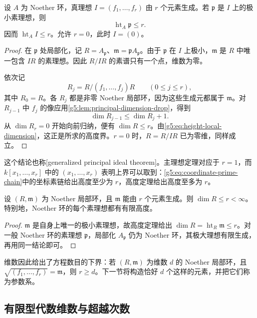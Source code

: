 \begin{theorem}\label{g5:thm:height-theorem}
	设 \(A\) 为 Noether 环，真理想 \(I=(f_1,\ldots,f_r)\) 由 \(r\) 个元素生成。若 \(\mathfrak p\) 是 \(I\) 上的极小素理想，则
	\[
	\operatorname{ht}_A\mathfrak p\leq r.
	\]
	因而 \(\operatorname{ht}_A I\leq r\)。允许 \(r=0\)，此时 \(I=(0)\)。
\end{theorem}
\begin{proof}
	在 \(\mathfrak p\) 处局部化，记 \(R=A_{\mathfrak p}\)、\(\mathfrak m=\mathfrak pA_{\mathfrak p}\)。由于 \(\mathfrak p\) 在 \(I\) 上极小，\(\mathfrak m\) 是 \(R\) 中唯一包含 \(IR\) 的素理想。因此 \(R/IR\) 的素谱只有一个点，维数为零。

	依次记
	\[
	R_j=R/(f_1,\ldots,f_j)R\qquad(0\leq j\leq r),
	\]
	其中 \(R_0=R\)。各 \(R_j\) 都是非零 Noether 局部环，因为这些生成元都属于 \(\mathfrak m\)。对 \(R_{j-1}\) 中 \(f_j\) 的像应用\cref{g5:lem:principal-dimension-drop}，得到
	\[
	\dim R_{j-1}\leq\dim R_j+1.
	\]
	从 \(\dim R_r=0\) 开始向前归纳，便有 \(\dim R\leq r\)。由\eqref{g5:eq:height-local-dimension}，这正是所求的高度界。\(r=0\) 时，\(R=R/IR\) 已为零维，同样成立。
\end{proof}

这个结论也称[generalized principal ideal theorem]。主理想定理对应于 \(r=1\)，而 \(k[x_1,\ldots,x_r]\) 中的 \((x_1,\ldots,x_r)\) 表明上界可以取到：\eqref{g5:eq:coordinate-prime-chain}中的坐标素链给出高度至少为 \(r\)，高度定理给出高度至多为 \(r\)。

\begin{corollary}\label{g5:cor:noetherian-local-finite-dimension}
	设 \((R,\mathfrak m)\) 为 Noether 局部环，且 \(\mathfrak m\) 能由 \(r\) 个元素生成。则 \(\dim R\leq r<\infty\)。特别地，Noether 环的每个素理想都有有限高度。
\end{corollary}
\begin{proof}
	\(\mathfrak m\) 是自身上唯一的极小素理想，故高度定理给出
	\(\dim R=\operatorname{ht}_R\mathfrak m\leq r\)。对一般 Noether 环的素理想 \(\mathfrak p\)，局部化 \(A_{\mathfrak p}\) 仍为 Noether 环，其极大理想有限生成，再用同一结论即可。
\end{proof}

维数因此给出了方程数目的下界：若 \((R,\mathfrak m)\) 为维数 \(d\) 的 Noether 局部环，且 \(\sqrt{(f_1,\ldots,f_r)}=\mathfrak m\)，则 \(r\geq d\)。下一节将构造恰好 \(d\) 个这样的元素，并把它们称为参数系。

\subsection{有限型代数维数与超越次数}
\label{g5:subsec:0303:04}

